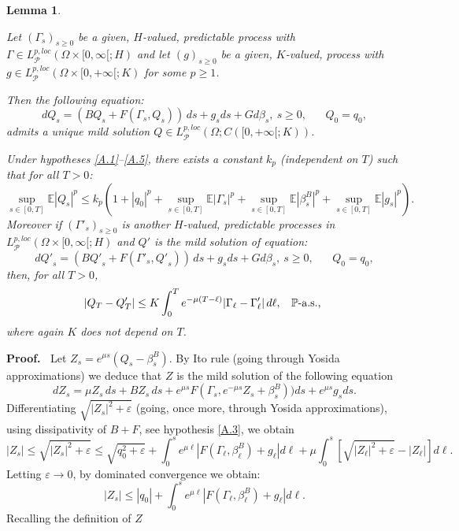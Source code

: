\documentclass[reqno,a4paper,11 pt]{article}
\def \E {\mathbb{E}}
\def \e {\varepsilon}
\newtheorem{lemma}[theorem]{Lemma}
\numberwithin{equation}{section}
\def\Dim{\noindent\hbox{{\bf Proof.}$\;\; $}}          %
\begin{document}
\begin{lemma}\label{dipendcont}

Let $(\Gamma_s)_{s\geq 0}$ be a  given, $H$-valued, predictable process with $\Gamma \in L^{p,loc}_{\mathcal{P}}(\Omega\times[0,\infty[;H)$ and let $(g)_{s\geq 0}$ be a given, $K$-valued, process with $g \in L^{p,loc}_{\mathcal{P}}(\Omega\times[0,+\infty[;K)$ for some $p\geq 1$.

Then the  following  equation:
\begin{equation} \label{problemalimiteyX}
d{Q}_s=(B{Q}_s+ F(\Gamma_s,{Q}_s))\,ds +g_sds+ Gd\beta_s, \ s \geq 0,
\hspace{20pt} {Q}_0= q_0,
\end{equation}
 admits a unique mild solution $Q \in L^{p,loc}_{\mathcal{P}}(\Omega;C([0,+\infty[;K))$.


Under hypotheses \eqref{A.1}--\eqref{A.5}, there exists a constant $k_p$ (independent on $T$) such that for all $T>0$:
\begin{equation}
\sup_{s\in [0,T]}\E |{Q}_s|^p \leq k_p(1+ |q_0|^p + \sup_{s\in [0,T]}\E|\Gamma_s|^p+\sup_{s\in [0,T]}\E|\beta^B_s|^p+\sup_{s\in [0,T]}\E|g_s|^p).
\end{equation}
Moreover if $(\Gamma'_s)_{s\geq 0}$ is another  $H$-valued, predictable processes in $ L^{p,loc}_{\mathcal{P}}(\Omega\times[0,\infty[;H)$ and $Q'$ is the mild solution of equation:
 $$
d{Q'}_s=(B{Q'}_s+ F(\Gamma'_s,{Q'}_s))\,ds +g_sds+ Gd\beta_s, \ s \geq 0,
\hspace{20pt} {Q}_0= q_0,
$$
then, for all $T>0$,
 $$|Q_T-Q'_T|\leq K \int_0^T e^{-\mu(T-\ell)}|\Gamma_{\ell}-\Gamma'_{\ell}| \, d\ell,\;\; \hbox{ $\mathbb{P}$-a.s., }$$
  where again $K$ does not depend on $T$.
\end{lemma}
\Dim 
Let $Z_s=e^{\mu s}(Q_s-\beta^B_s)$.  By Ito rule (going through Yosida approximations) we deduce that $Z$ is the mild solution of the following equation 
$$d {Z_s}=\mu Z_s\, ds+BZ_s\, ds+e^{\mu s}F(\Gamma_s,e^{-\mu s}Z_s+\beta^B_s))ds+e^{\mu s}g_sds.$$
Differentiating $\sqrt{|Z_s|^2+\e}$ (going, once more, through Yosida approximations), using dissipativity of $B+F$, see  hypothesis \ref{A.3}, we obtain
$$|Z_s|\leq \sqrt{|Z_s|^2+\e}\leq \sqrt{q^2_0+ \e}+\int_0^s e^{\mu \ell}\left|F(\Gamma_{\ell},\beta^B_{\ell})+g_{\ell}\right| d\ell +\mu \int_0^s \left[\sqrt{|Z_{\ell}|^2+\e}-|Z_\ell| \right]d\ell.$$
Letting $\e \rightarrow 0$, by dominated convergence we obtain:
$$|Z_s|\leq |q_0|+\int_0^s e^{\mu \ell}\left|F(\Gamma_{\ell},\beta^B_{\ell})+g_{\ell}\right| d\ell. $$ 
Recalling the definition of $Z$
\end{document}
